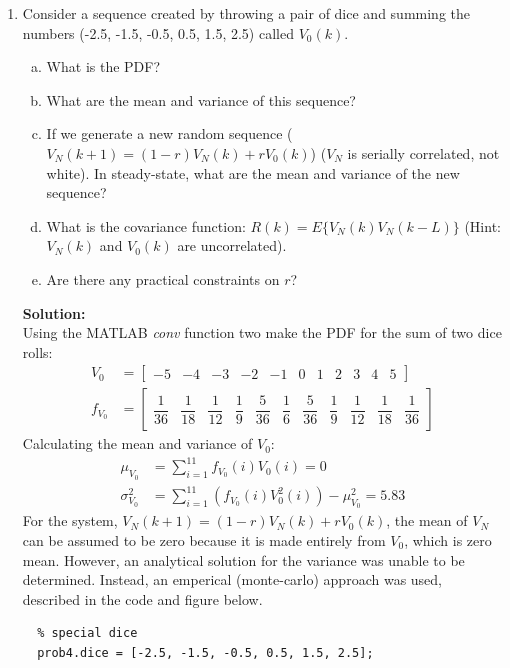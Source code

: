 \documentclass[11pt]{article}
\newcommand{\solution}{\textbf{Solution: \\}}
\begin{document}
\begin{enumerate}[label=\textbf{\arabic*.}]
  \item Consider a sequence created by throwing a pair of dice and summing the 
  numbers (-2.5, -1.5, -0.5, 0.5, 1.5, 2.5) called $V_0(k)$.
  \begin{enumerate}[(a)]
    \itemsep -2pt
    \item What is the PDF?
    \item What are the mean and variance of this sequence?
    \item If we generate a new random sequence ($V_N(k+1)=(1-r)V_N(k)+rV_0(k)$) 
    ($V_N$ is serially correlated, not white). In steady-state, what are the 
    mean and variance of the new sequence?
    \item What is the covariance function: $R(k)=E\{V_N(k)V_N(k-L)\}$ (Hint: 
    $V_N(k)$ and $V_0(k)$ are uncorrelated).
    \item Are there any practical constraints on $r$?
  \end{enumerate}
  \solution
  Using the MATLAB \emph{conv} function two make the PDF for the sum 
  of two dice rolls:
  \begin{equation*}
    \begin{split}
      V_0 &=
      \begin{bmatrix}
        -5 & -4 & -3 & -2 & -1 & 0 & 1 & 2 & 3 & 4 & 5
      \end{bmatrix}
      \\ f_{V_0} &= 
      \begin{bmatrix} 
        \dfrac{1}{36} & \dfrac{1}{18} & \dfrac{1}{12} & \dfrac{1}{9} & \dfrac{5}{36} & \dfrac{1}{6} & \dfrac{5}{36} & \dfrac{1}{9} & \dfrac{1}{12} & \dfrac{1}{18} & \dfrac{1}{36}
      \end{bmatrix}
    \end{split}
  \end{equation*}
  Calculating the mean and variance of $V_0$:
  \begin{equation*}
    \begin{split}
      \mu_{V_0} &= \sum_{i=1}^{11} f_{V_0}(i)V_0(i) = 0\\
      \sigma_{V_0}^2 &= \sum_{i=1}^{11} \left(f_{V_0}(i)V_0^2(i)\right) - \mu_{V_0}^2 = 5.83
    \end{split}
  \end{equation*}
  For the system, $V_N(k+1)=(1-r)V_N(k)+rV_0(k)$, the mean of $V_N$ can 
  be assumed to be zero because it is made entirely from $V_0$, which 
  is zero mean. However, an analytical solution for the variance was 
  unable to be determined. Instead, an emperical (monte-carlo) approach 
  was used, described in the code and figure below.
  \begin{lstlisting}
  % special dice
  prob4.dice = [-2.5, -1.5, -0.5, 0.5, 1.5, 2.5];


\end{lstlisting}
\end{enumerate}
\end{document}
